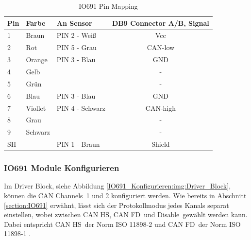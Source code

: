 \pagebreak[1]
\begin{table}[!ht]
	\centering
	\caption{IO691 Pin Mapping}
	\label{speedgoat:IO691}
	\begin{tabular}{lllc}
		\hline
		\textbf{Pin}            & \textbf{Farbe} & \textbf{An Sensor} & \textbf{DB9 Connector A/B, Signal} \\ \hline
		\multicolumn{1}{l|}{1}  & Braun          & PIN 2 -  Weiß      & Vcc                                \\
		\multicolumn{1}{l|}{2}  & Rot            & PIN 5 -  Grau      & CAN-low                            \\
		\multicolumn{1}{l|}{3}  & Orange         & PIN 3 -  Blau      & GND                                \\
		\multicolumn{1}{l|}{4}  & Gelb           &                    & -                                  \\
		\multicolumn{1}{l|}{5}  & Grün           &                    & -                                  \\
		\multicolumn{1}{l|}{6}  & Blau           & PIN 3 -  Blau      & GND                                \\
		\multicolumn{1}{l|}{7}  & Viollet        & PIN 4 -  Schwarz   & CAN-high                           \\
		\multicolumn{1}{l|}{8}  & Grau           &                    & -                                  \\
		\multicolumn{1}{l|}{9}  & Schwarz        &                    & -                                  \\
		\multicolumn{1}{l|}{SH} &                & PIN 1 - Braun      & Shield                             \\ \hline
	\end{tabular}
\end{table}
\pagebreak[1]


\subsubsection{IO691 Module Konfigurieren}
\label{Simulink:IO691_Konfigurieren}

Im \frqq Driver Block\flqq, siehe Abbildung \ref{IO691_Konfigurieren:img:Driver_Block}, können die \frqq CAN Channels\flqq\ 1 und 2 konfiguriert werden. Wie bereits in Abschnitt \ref{section:IO691} erwähnt, lässt sich der Protokollmodus jedes Kanals separat einstellen, wobei zwischen \frqq CAN HS\flqq, \frqq CAN FD\flqq\ und \frqq Disable\flqq\ gewählt werden kann. Dabei entspricht \frqq CAN HS\flqq\ der Norm ISO 11898-2 und \frqq CAN FD\flqq\ der Norm ISO 11898-1 \cite[4]{speedgoat:IO691}.

